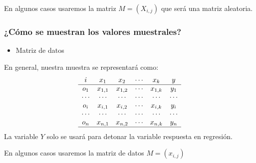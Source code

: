 En algunos casos usaremos la matriz $M=(X_{i,j})$ que será una matriz aleatoria.
\subsubsection{¿Cómo se muestran los valores muestrales?}

\begin{figure}
\end{figure}

\begin{itemize}[label=\color{red}\textbullet, leftmargin=*]
	\item \color{lightblue}Matriz de datos
\end{itemize}
En general, nuestra muestra se representará como: 
\[ \begin{array}{cccccc}
i & x_1 & x_2 & \cdots & x_k & y \\ \hline
o_1 & x_{1,1} & x_{1,2} & \cdots & x_{1,k} & y_1 \\
\cdots & \cdots & \cdots & \cdots & \cdots & \cdots \\
o_i & x_{i,1} & x_{i,2} & \cdots & x_{i,k} & y_i \\
\cdots & \cdots & \cdots & \cdots & \cdots & \cdots \\
o_n & x_{n,1} & x_{n,2} & \cdots & x_{n,k} & y_n \\ \hline
\end{array} \]
La variable $Y$ solo se usará para detonar la variable respuesta en regresión.

En algunos casos usaremos la matriz de datos $M=(x_{i,j})$